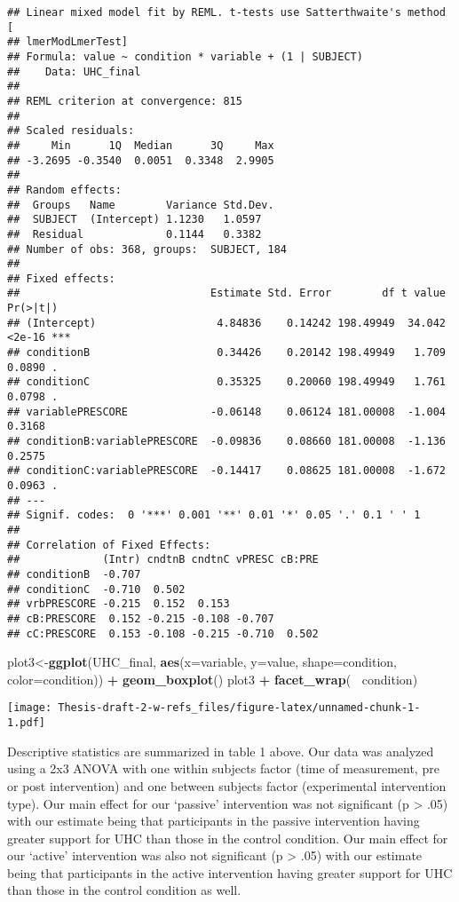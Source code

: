 \documentclass[
]{article}
\newenvironment{Shaded}{\begin{snugshade}}{\end{snugshade}}
\newcommand{\DataTypeTok}[1]{\textcolor[rgb]{0.13,0.29,0.53}{#1}}
\newcommand{\KeywordTok}[1]{\textcolor[rgb]{0.13,0.29,0.53}{\textbf{#1}}}
\newcommand{\NormalTok}[1]{#1}
\newcommand{\OperatorTok}[1]{\textcolor[rgb]{0.81,0.36,0.00}{\textbf{#1}}}
\newcommand{\StringTok}[1]{\textcolor[rgb]{0.31,0.60,0.02}{#1}}
\begin{document}
\begin{verbatim}
## Linear mixed model fit by REML. t-tests use Satterthwaite's method [
## lmerModLmerTest]
## Formula: value ~ condition * variable + (1 | SUBJECT)
##    Data: UHC_final
## 
## REML criterion at convergence: 815
## 
## Scaled residuals: 
##     Min      1Q  Median      3Q     Max 
## -3.2695 -0.3540  0.0051  0.3348  2.9905 
## 
## Random effects:
##  Groups   Name        Variance Std.Dev.
##  SUBJECT  (Intercept) 1.1230   1.0597  
##  Residual             0.1144   0.3382  
## Number of obs: 368, groups:  SUBJECT, 184
## 
## Fixed effects:
##                              Estimate Std. Error        df t value Pr(>|t|)    
## (Intercept)                   4.84836    0.14242 198.49949  34.042   <2e-16 ***
## conditionB                    0.34426    0.20142 198.49949   1.709   0.0890 .  
## conditionC                    0.35325    0.20060 198.49949   1.761   0.0798 .  
## variablePRESCORE             -0.06148    0.06124 181.00008  -1.004   0.3168    
## conditionB:variablePRESCORE  -0.09836    0.08660 181.00008  -1.136   0.2575    
## conditionC:variablePRESCORE  -0.14417    0.08625 181.00008  -1.672   0.0963 .  
## ---
## Signif. codes:  0 '***' 0.001 '**' 0.01 '*' 0.05 '.' 0.1 ' ' 1
## 
## Correlation of Fixed Effects:
##             (Intr) cndtnB cndtnC vPRESC cB:PRE
## conditionB  -0.707                            
## conditionC  -0.710  0.502                     
## vrbPRESCORE -0.215  0.152  0.153              
## cB:PRESCORE  0.152 -0.215 -0.108 -0.707       
## cC:PRESCORE  0.153 -0.108 -0.215 -0.710  0.502
\end{verbatim}

\begin{Shaded}
\begin{Highlighting}[]
\NormalTok{plot3<-}\KeywordTok{ggplot}\NormalTok{(UHC_final, }\KeywordTok{aes}\NormalTok{(}\DataTypeTok{x=}\NormalTok{variable, }\DataTypeTok{y=}\NormalTok{value, }\DataTypeTok{shape=}\NormalTok{condition, }\DataTypeTok{color=}\NormalTok{condition)) }\OperatorTok{+}
\StringTok{  }\KeywordTok{geom_boxplot}\NormalTok{()}
\NormalTok{plot3 }\OperatorTok{+}\StringTok{ }\KeywordTok{facet_wrap}\NormalTok{(}\OperatorTok{~}\StringTok{ }\NormalTok{condition)}
\end{Highlighting}
\end{Shaded}

\texttt{[image: Thesis-draft-2-w-refs\_files/figure-latex/unnamed-chunk-1-1.pdf]}

Descriptive statistics are summarized in table 1 above. Our data was
analyzed using a 2x3 ANOVA with one within subjects factor (time of
measurement, pre or post intervention) and one between subjects factor
(experimental intervention type). Our main effect for our `passive'
intervention was not significant (p \textgreater{} .05) with our
estimate being that participants in the passive intervention having
greater support for UHC than those in the control condition. Our main
effect for our `active' intervention was also not significant (p
\textgreater{} .05) with our estimate being that participants in the
active intervention having greater support for UHC than those in the
control condition as well.
\end{document}
